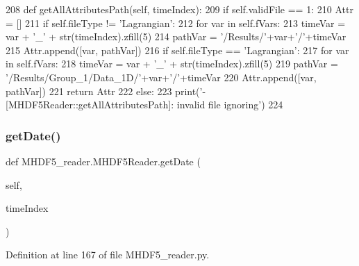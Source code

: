 \begin{DoxyCode}
208     \textcolor{keyword}{def }getAllAttributesPath(self, timeIndex):
209         \textcolor{keywordflow}{if} self.validFile == 1:
210             Attr = []
211             \textcolor{keywordflow}{if} self.fileType != \textcolor{stringliteral}{'Lagrangian'}:
212                 \textcolor{keywordflow}{for} var \textcolor{keywordflow}{in} self.fVars:
213                     timeVar = var + \textcolor{stringliteral}{'\_'} + str(timeIndex).zfill(5)
214                     pathVar = \textcolor{stringliteral}{'/Results/'}+var+\textcolor{stringliteral}{'/'}+timeVar
215                     Attr.append([var, pathVar])
216             \textcolor{keywordflow}{if} self.fileType == \textcolor{stringliteral}{'Lagrangian'}:
217                 \textcolor{keywordflow}{for} var \textcolor{keywordflow}{in} self.fVars:
218                     timeVar = var + \textcolor{stringliteral}{'\_'} + str(timeIndex).zfill(5)
219                     pathVar = \textcolor{stringliteral}{'/Results/Group\_1/Data\_1D/'}+var+\textcolor{stringliteral}{'/'}+timeVar
220                     Attr.append([var, pathVar])
221             \textcolor{keywordflow}{return} Attr
222         \textcolor{keywordflow}{else}:
223             print(\textcolor{stringliteral}{'- [MHDF5Reader::getAllAttributesPath]: invalid file ignoring'})        
224     
\end{DoxyCode}
\mbox{\label{class_m_h_d_f5__reader_1_1_m_h_d_f5_reader_a0c16ad2e43bb3171cfec1b227e042218}} 
\subsubsection{\texorpdfstring{get\+Date()}{getDate()}}
{\footnotesize\ttfamily def M\+H\+D\+F5\+\_\+reader.\+M\+H\+D\+F5\+Reader.\+get\+Date (\begin{DoxyParamCaption}\item[{}]{self,  }\item[{}]{time\+Index }\end{DoxyParamCaption})}



Definition at line 167 of file M\+H\+D\+F5\+\_\+reader.\+py.


